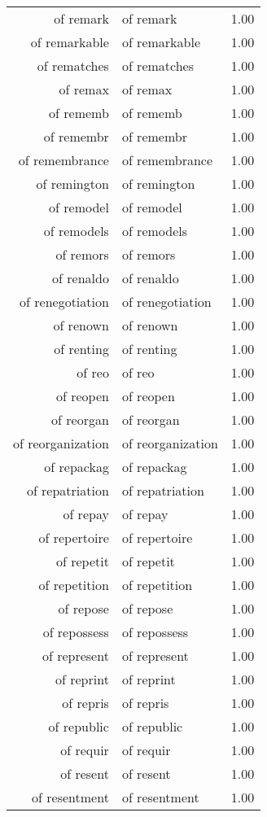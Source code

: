 \begin{table}[ht]
\begin{tabular}{rlr}
  of remark & of remark & 1.00 \\ 
  of remarkable & of remarkable & 1.00 \\ 
  of rematches & of rematches & 1.00 \\ 
  of remax & of remax & 1.00 \\ 
  of rememb & of rememb & 1.00 \\ 
  of remembr & of remembr & 1.00 \\ 
  of remembrance & of remembrance & 1.00 \\ 
  of remington & of remington & 1.00 \\ 
  of remodel & of remodel & 1.00 \\ 
  of remodels & of remodels & 1.00 \\ 
  of remors & of remors & 1.00 \\ 
  of renaldo & of renaldo & 1.00 \\ 
  of renegotiation & of renegotiation & 1.00 \\ 
  of renown & of renown & 1.00 \\ 
  of renting & of renting & 1.00 \\ 
  of reo & of reo & 1.00 \\ 
  of reopen & of reopen & 1.00 \\ 
  of reorgan & of reorgan & 1.00 \\ 
  of reorganization & of reorganization & 1.00 \\ 
  of repackag & of repackag & 1.00 \\ 
  of repatriation & of repatriation & 1.00 \\ 
  of repay & of repay & 1.00 \\ 
  of repertoire & of repertoire & 1.00 \\ 
  of repetit & of repetit & 1.00 \\ 
  of repetition & of repetition & 1.00 \\ 
  of repose & of repose & 1.00 \\ 
  of repossess & of repossess & 1.00 \\ 
  of represent & of represent & 1.00 \\ 
  of reprint & of reprint & 1.00 \\ 
  of repris & of repris & 1.00 \\ 
  of republic & of republic & 1.00 \\ 
  of requir & of requir & 1.00 \\ 
  of resent & of resent & 1.00 \\ 
  of resentment & of resentment & 1.00 \\ 

\end{tabular}
\end{table}

